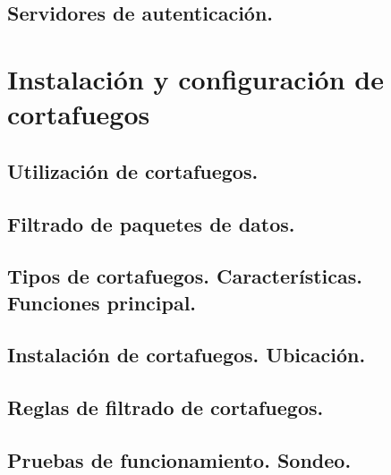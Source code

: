 \documentclass[letterpaper,10pt,spanish]{sphinxmanual}
\begin{document}
\section{Servidores de autenticación.}
\label{\detokenize{tema_acceso_remoto/tema_acceso_remoto:servidores-de-autenticacion}}

\chapter{Instalación y configuración de cortafuegos}
\label{\detokenize{tema_cortafuegos/tema_cortafuegos:instalacion-y-configuracion-de-cortafuegos}}\label{\detokenize{tema_cortafuegos/tema_cortafuegos::doc}}

\section{Utilización de cortafuegos.}
\label{\detokenize{tema_cortafuegos/tema_cortafuegos:utilizacion-de-cortafuegos}}

\section{Filtrado de paquetes de datos.}
\label{\detokenize{tema_cortafuegos/tema_cortafuegos:filtrado-de-paquetes-de-datos}}

\section{Tipos de cortafuegos. Características. Funciones principal.}
\label{\detokenize{tema_cortafuegos/tema_cortafuegos:tipos-de-cortafuegos-caracteristicas-funciones-principal}}

\section{Instalación de cortafuegos. Ubicación.}
\label{\detokenize{tema_cortafuegos/tema_cortafuegos:instalacion-de-cortafuegos-ubicacion}}

\section{Reglas de filtrado de cortafuegos.}
\label{\detokenize{tema_cortafuegos/tema_cortafuegos:reglas-de-filtrado-de-cortafuegos}}

\section{Pruebas de funcionamiento. Sondeo.}
\label{\detokenize{tema_cortafuegos/tema_cortafuegos:pruebas-de-funcionamiento-sondeo}}
\end{document}
